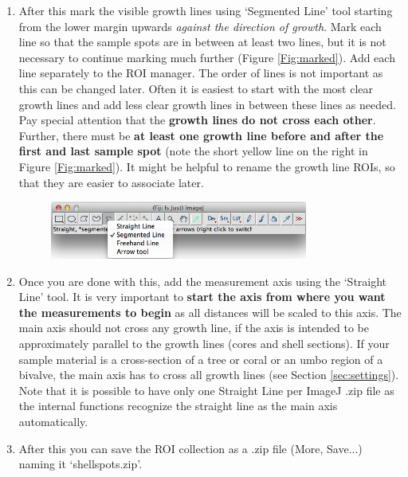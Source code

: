 \documentclass[11pt, a4paper]{article}
\begin{document}
\begin{enumerate}
\begin{figure}[H]
\begin{center}
\end{center}
\end{figure}
\item After this mark the visible growth lines using `Segmented Line' tool starting from the lower margin upwards \textit{against the direction of growth}. Mark each line so that the sample spots are in between at least two lines, but it is not necessary to continue marking much further (Figure \ref{Fig:marked}). Add each line separately to the ROI manager. The order of lines is not important as this can be changed later. Often it is easiest to start with the most clear growth lines and add less clear growth lines in between these lines as needed. Pay special attention that the \textbf{growth lines do not cross each other}. Further, there must be \textbf{at least one growth line before and after the first and last sample spot} (note the short yellow line on the right in Figure \ref{Fig:marked}). It might be helpful to rename the growth line ROIs, so that they are easier to associate later. 
\begin{figure}[H]
\begin{center}
\includegraphics[width = 0.8\textwidth]{segmented_line.png}
\end{center}
\end{figure}
\item Once you are done with this, add the measurement axis using the `Straight Line' tool. It is very important to \textbf{start the axis from where you want the measurements to begin} as all distances will be scaled to this axis. The main axis should not cross any growth line, if the axis is intended to be approximately parallel to the growth lines (cores and shell sections). If your sample material is a cross-section of a tree or coral or an umbo region of a bivalve, the main axis has to cross all growth lines (see Section \ref{sec:settings}). Note that it is possible to have only one Straight Line per ImageJ .zip file as the internal functions recognize the straight line as the main axis automatically. 
\item After this you can save the ROI collection as a .zip file (More, Save...) naming it `shellspots.zip'.
\end{enumerate}
\end{document}
